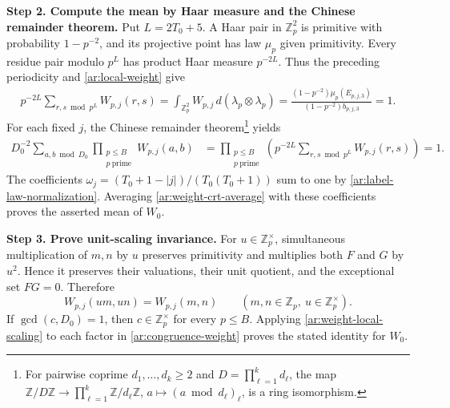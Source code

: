 \documentclass[twoside]{aomart}
\makeatletter
\theoremstyle{paperplain}
\theoremstyle{paperdefinition}
\renewenvironment{proof}[1][\proofname]{\par\pushQED{\qed}%
  \normalfont\topsep6\p@\@plus3\p@\relax\trivlist
  \item[\hskip\labelsep\itshape #1\@addpunct{.}]\ignorespaces
}{\popQED\endtrivlist\@endpefalse}
\newcommand{\Z}{\mathbb Z}
\numberwithin{equation}{section}
\makeatother
\begin{document}
\begin{proof}
\medskip
\noindent\textbf{Step 2. Compute the mean by Haar measure and the Chinese remainder theorem.}
Put $L=2T_0+5$. A Haar pair in $\Z_p^2$ is primitive with
probability $1-p^{-2}$, and its projective point has law
$\mu_p$ given primitivity. Every residue pair modulo $p^L$
has product Haar measure $p^{-2L}$. Thus the preceding
periodicity and \eqref{ar:local-weight} give
\begin{equation}
 \begin{aligned}
 p^{-2L}\sum_{r,s\bmod p^L}W_{p,j}(r,s)
 =\int_{\Z_p^2}W_{p,j}\,d(\lambda_p\otimes\lambda_p)
 =\frac{(1-p^{-2})\mu_p(E_{p,j,3})}
         {(1-p^{-2})b_{p,j,3}}=1.
 \end{aligned}
 \label{ar:weight-local-average}
\end{equation}
For each fixed $j$, the Chinese remainder theorem\footnote{For
pairwise coprime $d_1,\ldots,d_k\ge2$ and $D=\prod_{\ell=1}^k d_\ell$,
the map $\Z/D\Z\to\prod_{\ell=1}^k\Z/d_\ell\Z$,
$a\mapsto(a\bmod d_\ell)_\ell$, is a ring isomorphism.} yields
\begin{equation}
 \begin{aligned}
 D_0^{-2}\sum_{a,b\bmod D_0}\prod_{\substack{p\le B\\p\ \mathrm{prime}}}W_{p,j}(a,b)
 &=\prod_{\substack{p\le B\\p\ \mathrm{prime}}}\left(
 p^{-2L}\sum_{r,s\bmod p^L}W_{p,j}(r,s)\right)=1.
 \end{aligned}
 \label{ar:weight-crt-average}
\end{equation}
The coefficients
$\omega_j=(T_0+1-|j|)/(T_0(T_0+1))$ sum to one by
\eqref{ar:label-law-normalization}. Averaging
\eqref{ar:weight-crt-average} with these coefficients proves
the asserted mean of $W_0$.

\medskip
\noindent\textbf{Step 3. Prove unit-scaling invariance.}
For $u\in\Z_p^\times$, simultaneous multiplication of $m,n$
by $u$ preserves primitivity and multiplies both $F$ and $G$
by $u^2$. Hence it preserves their valuations, their unit
quotient, and the exceptional set $FG=0$. Therefore
\begin{equation}
 W_{p,j}(um,un)=W_{p,j}(m,n)
 \qquad(m,n\in\Z_p,\ u\in\Z_p^\times).
 \label{ar:weight-local-scaling}
\end{equation}
If $\gcd(c,D_0)=1$, then $c\in\Z_p^\times$ for every
$p\le B$. Applying \eqref{ar:weight-local-scaling} to each
factor in \eqref{ar:congruence-weight} proves the stated
identity for $W_0$.


\end{proof}
\end{document}
